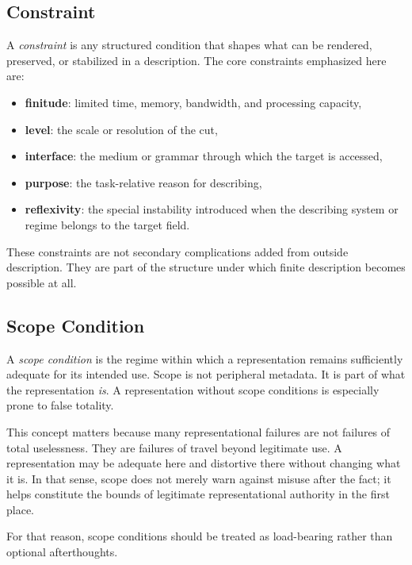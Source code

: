 \documentclass[11pt]{article}
\renewcommand{\emph}[1]{\textit{#1}}
\begin{document}
\subsection{Constraint}

A \emph{constraint} is any structured condition that shapes what can be rendered, preserved, or stabilized in a description. The core constraints emphasized here are:
\begin{itemize}
    \item \textbf{finitude}: limited time, memory, bandwidth, and processing capacity,
    \item \textbf{level}: the scale or resolution of the cut,
    \item \textbf{interface}: the medium or grammar through which the target is accessed,
    \item \textbf{purpose}: the task-relative reason for describing,
    \item \textbf{reflexivity}: the special instability introduced when the describing system or regime belongs to the target field.
\end{itemize}

These constraints are not secondary complications added from outside description. They are part of the structure under which finite description becomes possible at all.

\subsection{Scope Condition}

A \emph{scope condition} is the regime within which a representation remains sufficiently adequate for its intended use. Scope is not peripheral metadata. It is part of what the representation \emph{is}. A representation without scope conditions is especially prone to false totality. \cite{frigg_hartmann_models_sep,mitchell_model_cards,gebru_datasheets,nist_explainable_ai}

This concept matters because many representational failures are not failures of total uselessness. They are failures of travel beyond legitimate use. A representation may be adequate here and distortive there without changing what it is. In that sense, scope does not merely warn against misuse after the fact; it helps constitute the bounds of legitimate representational authority in the first place. \cite{mitchell_model_cards,gebru_datasheets,nist_explainable_ai}

For that reason, scope conditions should be treated as load-bearing rather than optional afterthoughts.
\end{document}
